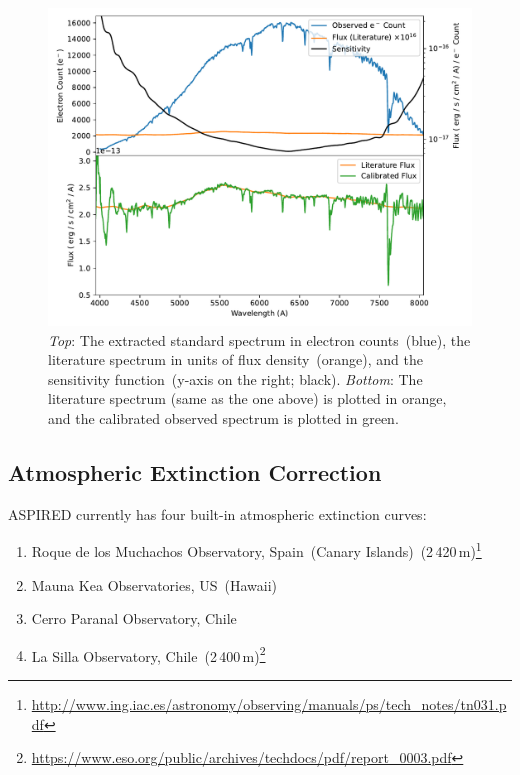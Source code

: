 \documentclass[linenumbers, twocolumn]{aastex631}
\begin{document}
\begin{figure}
    \centering
    \includegraphics[width=\columnwidth]{fig_06_flux_calibration_diagnostics.pdf}
    \caption{\textit{Top}: The extracted standard spectrum in electron
    counts~(blue), the literature spectrum in units of flux density~(orange),
    and the sensitivity function~(y-axis on the right; black). \textit{Bottom}:
    The literature spectrum (same as the one above) is plotted in orange, and
    the calibrated observed spectrum is plotted in green.}
    \label{fig:fluxcal}
\end{figure}

\subsection{Atmospheric Extinction Correction}
\textsc{ASPIRED} currently has four built-in atmospheric extinction curves:

\begin{enumerate}
    \item Roque de los Muchachos Observatory, Spain~(Canary Islands)~(2\,420\,m)\footnote{\url{http://www.ing.iac.es/astronomy/observing/manuals/ps/tech\_notes/tn031.pdf}}
    \item Mauna Kea Observatories, US~(Hawaii)~\citep[4\,205\,m;][]{2013A&A...549A...8B}
    \item Cerro Paranal Observatory, Chile~\citep[2\,635\,m;][]{2011A&A...527A..91P}
    \item La Silla Observatory, Chile~(2\,400\,m)\footnote{\url{https://www.eso.org/public/archives/techdocs/pdf/report\_0003.pdf}}
\end{enumerate}
\end{document}
